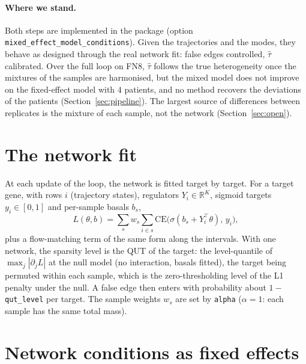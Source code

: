 \documentclass[a4paper, 11pt]{article}
\theoremstyle{plain}
\theoremstyle{remark}
\begin{document}
\paragraph{Where we stand.} Both steps are implemented in the package (option \texttt{mixed\_effect\_model\_conditions}). Given the trajectories and the modes, they behave as designed through the real network fit: false edges controlled, $\hat\tau$ calibrated. Over the full loop on FN8, $\hat\tau$ follows the true heterogeneity once the mixtures of the samples are harmonised, but the mixed model does not improve on the fixed-effect model with $4$ patients, and no method recovers the deviations of the patients (Section~\ref{sec:pipeline}). The largest source of differences between replicates is the mixture of each sample, not the network (Section~\ref{sec:open}).

\section{The network fit}\label{sec:fit}

At each update of the loop, the network is fitted target by target. For a target gene, with rows $i$ (trajectory states), regulators $Y_i \in \mathbb R^K$, sigmoid targets $y_i \in [0,1]$ and per-sample basals $b_s$,
\begin{equation}\label{eq:data}
L(\theta, b) = \sum_{s} w_s \sum_{i \in s} \mathrm{CE}\big(\sigma(b_s + Y_i^\top \theta),\, y_i\big),
\end{equation}
plus a flow-matching term of the same form along the intervals. With one network, the sparsity level is the QUT of the target: the level-quantile of $\max_j |\partial_j L|$ at the null model (no interaction, basals fitted), the target being permuted within each sample, which is the zero-thresholding level of the L1 penalty under the null. A false edge then enters with probability about $1 -$ \texttt{qut\_level} per target. The sample weights $w_s$ are set by \texttt{alpha} ($\alpha = 1$: each sample has the same total mass).

\section{Network conditions as fixed effects}\label{sec:fixed}
\end{document}
